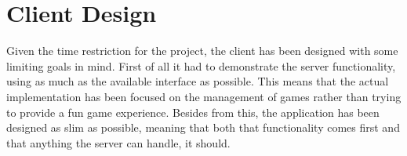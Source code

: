 \section{Client Design}
Given the time restriction for the project, the client has been designed with some limiting goals in mind. First of all it had to demonstrate the server functionality, using as much as the available interface as possible. This means that the actual implementation has been focused on the management of games rather than trying to provide a fun game experience. Besides from this, the application has been designed as slim as possible, meaning that both that functionality comes first and that anything the server can handle, it should.


